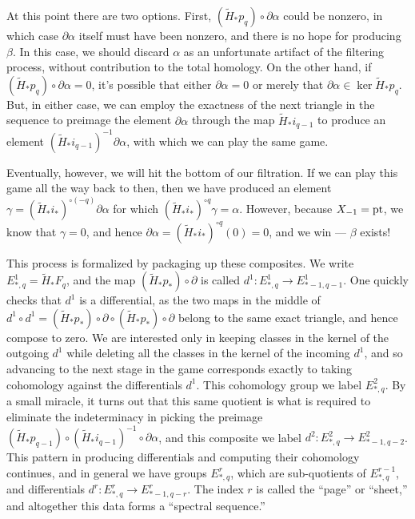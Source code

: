 At this point there are two options.  First, $(\tilde H_* p_q) \circ \partial \alpha$ could be nonzero, in which case $\partial \alpha$ itself must have been nonzero, and there is no hope for producing $\beta$.  In this case, we should discard $\alpha$ as an unfortunate artifact of the filtering process, without contribution to the total homology.  On the other hand, if $(\tilde H_* p_q) \circ \partial \alpha = 0$, it's possible that either $\partial \alpha = 0$ or merely that $\partial \alpha \in \ker \tilde H_* p_q$.  But, in either case, we can employ the exactness of the next triangle in the sequence to preimage the element $\partial \alpha$ through the map $\tilde H_* i_{q-1}$ to produce an element $(\tilde H_* i_{q-1})^{-1} \partial \alpha$, with which we can play the same game.

Eventually, however, we will hit the bottom of our filtration.  If we can play this game all the way back to then, then we have produced an element $\gamma = (\tilde H_* i_*)^{\circ (-q)} \partial \alpha$ for which $(\tilde H_* i_*)^{\circ q} \gamma = \alpha$.  However, because $X_{-1} = \operatorname{pt}$, we know that $\gamma = 0$, and hence $\partial \alpha = (\tilde H_* i_*)^{\circ q}(0) = 0$, and we win --- $\beta$ exists!

This process is formalized by packaging up these composites.  We write $E^1_{*, q} = \tilde H_* F_q$, and the map $(\tilde H_* p_*) \circ \partial$ is called $d^1: E^1_{*, q} \to E^1_{*-1, q-1}$.  One quickly checks that $d^1$ is a differential, as the two maps in the middle of $d^1 \circ d^1 = (\tilde H_* p_*) \circ \partial \circ (\tilde H_* p_*) \circ \partial$ belong to the same exact triangle, and hence compose to zero.  We are interested only in keeping classes in the kernel of the outgoing $d^1$ while deleting all the classes in the kernel of the incoming $d^1$, and so advancing to the next stage in the game corresponds exactly to taking cohomology against the differentials $d^1$.  This cohomology group we label $E^2_{*, q}$.  By a small miracle, it turns out that this same quotient is what is required to eliminate the indeterminacy in picking the preimage $(\tilde H_* p_{q-1}) \circ (\tilde H_* i_{q-1})^{-1} \circ \partial \alpha$, and this composite we label $d^2: E^2_{*, q} \to E^2_{*-1, q-2}$.  This pattern in producing differentials and computing their cohomology continues, and in general we have groups $E^r_{*, q}$, which are sub-quotients of $E^{r-1}_{*, q}$, and differentials $d^r: E^r_{*, q} \to E^r_{*-1, q-r}$.  The index $r$ is called the ``page'' or ``sheet,'' and altogether this data forms a ``spectral sequence.''

